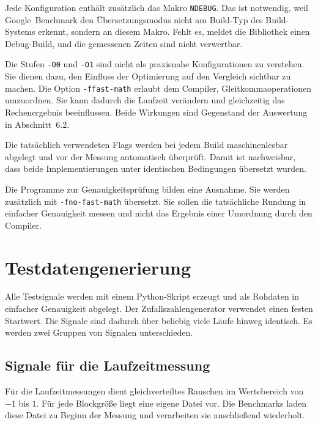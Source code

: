 Jede Konfiguration enthält zusätzlich das Makro \texttt{NDEBUG}. Das ist
notwendig, weil Google~Benchmark den Übersetzungsmodus nicht am Build-Typ des
Build-Systems erkennt, sondern an diesem Makro. Fehlt es, meldet die
Bibliothek einen Debug-Build, und die gemessenen Zeiten sind nicht
verwertbar.

Die Stufen \texttt{-O0} und \texttt{-O1} sind nicht als praxisnahe
Konfigurationen zu verstehen. Sie dienen dazu, den Einfluss der Optimierung
auf den Vergleich sichtbar zu machen. Die Option \texttt{-ffast-math} erlaubt
dem Compiler, Gleitkommaoperationen umzuordnen. Sie kann dadurch die Laufzeit
verändern und gleichzeitig das Rechenergebnis beeinflussen. Beide Wirkungen
sind Gegenstand der Auswertung in Abschnitt~6.2.

Die tatsächlich verwendeten Flags werden bei jedem Build maschinenlesbar
abgelegt und vor der Messung automatisch überprüft. Damit ist nachweisbar,
dass beide Implementierungen unter identischen Bedingungen übersetzt wurden.

Die Programme zur Genauigkeitsprüfung bilden eine Ausnahme. Sie werden
zusätzlich mit \texttt{-fno-fast-math} übersetzt. Sie sollen die tatsächliche
Rundung in einfacher Genauigkeit messen und nicht das Ergebnis einer
Umordnung durch den Compiler.


\section{Testdatengenerierung}
\label{sec:testdaten}

Alle Testsignale werden mit einem Python-Skript erzeugt und als Rohdaten in
einfacher Genauigkeit abgelegt. Der Zufallszahlengenerator verwendet einen
festen Startwert. Die Signale sind dadurch über beliebig viele Läufe hinweg
identisch. Es werden zwei Gruppen von Signalen unterschieden.

\subsection{Signale für die Laufzeitmessung}

Für die Laufzeitmessungen dient gleichverteiltes Rauschen im Wertebereich von
$-1$ bis $1$. Für jede Blockgröße liegt eine eigene Datei vor. Die Benchmarks
laden diese Datei zu Beginn der Messung und verarbeiten sie anschließend
wiederholt.

